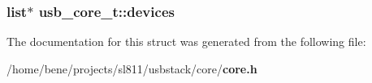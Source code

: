 \subsubsection{\setlength{\rightskip}{0pt plus 5cm}list$\ast$ {\bf usb\_\-core\_\-t::devices}}\label{structusb__core__t_2983961aa41c8e9a54945f950c7b9c34}




The documentation for this struct was generated from the following file:\begin{CompactItemize}
\item 
/home/bene/projects/sl811/usbstack/core/{\bf core.h}\end{CompactItemize}
